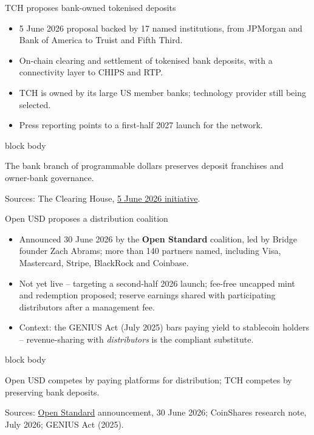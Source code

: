 \documentclass[aspectratio=169,12pt]{beamer}
\newcommand{\rust}[1]{\textcolor{Rust}{\textbf{#1}}}
\newcommand{\source}[1]{\vfill\par\fontsize{5.4}{6.5}\selectfont\color{Quiet}Sources: #1}
\newcommand{\tightitems}{\setlength{\itemsep}{0.42em}\setlength{\parskip}{0pt}}
\newenvironment{statement}{%
  \begin{beamercolorbox}[sep=.18cm,rounded=false,wd=\linewidth]{block body}%
  \fontsize{13}{15.5}\selectfont\bfseries
}{\end{beamercolorbox}}
\begin{document}
\begin{frame}{TCH proposes bank-owned tokenised deposits}
  \begin{itemize}\tightitems
    \item 5 June 2026 proposal backed by 17 named institutions, from JPMorgan and Bank of America to Truist and Fifth Third.
    \item On-chain clearing and settlement of tokenised bank deposits, with a connectivity layer to CHIPS and RTP.
    \item TCH is owned by its large US member banks; technology provider still being selected.
    \item Press reporting points to a first-half 2027 launch for the network.
  \end{itemize}
  \begin{statement}
    The bank branch of programmable dollars preserves deposit franchises and owner-bank governance.
  \end{statement}
  \source{The Clearing House, \href{https://www.theclearinghouse.org/payment-systems/Articles/2026/06/Major-Financial-Institutions-Unveil-Bank-Led-On-Chain-Money-Initiative}{5 June 2026 initiative}.}
\end{frame}

\begin{frame}{Open USD proposes a distribution coalition}
  \begin{itemize}\tightitems
    \item Announced 30 June 2026 by the \rust{Open Standard} coalition, led by Bridge founder Zach Abrams; more than 140 partners named, including Visa, Mastercard, Stripe, BlackRock and Coinbase.
    \item Not yet live -- targeting a second-half 2026 launch; fee-free uncapped mint and redemption proposed; reserve earnings shared with participating distributors after a management fee.
    \item Context: the GENIUS Act (July 2025) bars paying yield to stablecoin holders -- revenue-sharing with \emph{distributors} is the compliant substitute.
  \end{itemize}
  \begin{statement}
    Open USD competes by paying platforms for distribution; TCH competes by preserving bank deposits.
  \end{statement}
  \source{\href{https://joinopenstandard.com/}{Open Standard} announcement, 30 June 2026; CoinShares research note, July 2026; GENIUS Act (2025).}
\end{frame}
\end{document}
